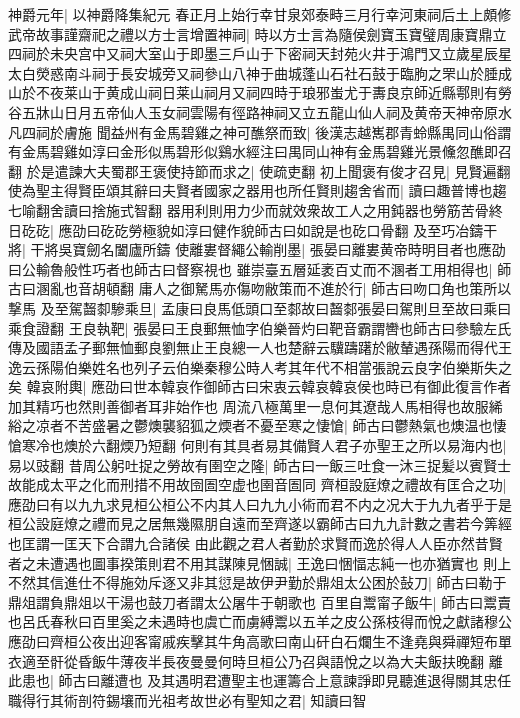神爵元年|{
	以神爵降集紀元}
春正月上始行幸甘泉郊泰畤三月行幸河東祠后土上頗修武帝故事謹齋祀之禮以方士言增置神祠|{
	時以方士言為隨侯劍寶玉寶璧周康寶鼎立四祠於未央宫中又祠大室山于即墨三戶山于下密祠天封苑火井于鴻門又立歲星辰星太白熒惑南斗祠于長安城旁又祠參山八神于曲城蓬山石社石鼓于臨朐之罘山於腄成山於不夜莱山于黄成山祠日莱山祠月又祠四時于琅邪蚩尤于夀良京師近縣鄠則有勞谷五牀山日月五帝仙人玉女祠雲陽有徑路神祠又立五龍山仙人祠及黄帝天神帝原水凡四祠於膚施}
聞益州有金馬碧雞之神可醮祭而致|{
	後漢志越嶲郡青蛉縣禺同山俗謂有金馬碧雞如淳曰金形似馬碧形似鷄水經注曰禺同山神有金馬碧雞光景儵忽醮即召翻}
於是遣諫大夫蜀郡王褒使持節而求之|{
	使疏吏翻}
初上聞褒有俊才召見|{
	見賢遍翻}
使為聖主得賢臣頌其辭曰夫賢者國家之器用也所任賢則趨舍省而|{
	讀曰趣普博也趨七喻翻舍讀曰捨施式智翻}
器用利則用力少而就效衆故工人之用鈍器也勞筋苦骨終日矻矻|{
	應劭曰矻矻勞極貌如淳曰健作貌師古曰如說是也矻口骨翻}
及至巧冶鑄干將|{
	干將吳寶劒名闔廬所鑄}
使離婁督繩公輸削墨|{
	張晏曰離婁黄帝時明目者也應劭曰公輸魯般性巧者也師古曰督察視也}
雖崇臺五層延袤百丈而不溷者工用相得也|{
	師古曰溷亂也音胡頓翻}
庸人之御駑馬亦傷吻敝策而不進於行|{
	師古曰吻口角也策所以撃馬}
及至駕齧厀驂乘旦|{
	孟康曰良馬低頭口至䣛故曰齧䣛張晏曰駕則旦至故曰乘曰乘食證翻}
王良執靶|{
	張晏曰王良郵無恤字伯樂晉灼曰靶音霸謂轡也師古曰參驗左氏傳及國語孟子郵無恤郵良劉無止王良總一人也楚辭云驥躊躇於敝輦遇孫陽而得代王逸云孫陽伯樂姓名也列子云伯樂秦穆公時人考其年代不相當張說云良字伯樂斯失之矣}
韓哀附輿|{
	應劭曰世本韓哀作御師古曰宋衷云韓哀韓哀侯也時已有御此復言作者加其精巧也然則善御者耳非始作也}
周流八極萬里一息何其遼哉人馬相得也故服絺綌之凉者不苦盛暑之鬱燠襲貂狐之煗者不憂至寒之悽愴|{
	師古曰鬱熱氣也燠温也悽愴寒冷也燠於六翻煗乃短翻}
何則有其具者易其備賢人君子亦聖王之所以易海内也|{
	易以豉翻}
昔周公躬吐捉之勞故有圉空之隆|{
	師古曰一飯三吐食一沐三捉髪以賓賢士故能成太平之化而刑措不用故囹圄空虚也圉音圄同}
齊桓設庭燎之禮故有匡合之功|{
	應劭曰有以九九求見桓公桓公不内其人曰九九小術而君不内之况大于九九者乎于是桓公設庭燎之禮而見之居無幾隰朋自遠而至齊遂以霸師古曰九九計數之書若今筭經也匡謂一匡天下合謂九合諸侯}
由此觀之君人者勤於求賢而逸於得人人臣亦然昔賢者之未遭遇也圖事揆策則君不用其謀陳見悃誠|{
	王逸曰悃愊志純一也亦猶實也}
則上不然其信進仕不得施効斥逐又非其愆是故伊尹勤於鼎俎太公困於鼔刀|{
	師古曰勒于鼎俎謂負鼎俎以干湯也鼓刀者謂太公屠牛于朝歌也}
百里自鬻甯子飯牛|{
	師古曰鬻賣也呂氏春秋曰百里奚之未遇時也虞亡而虜縛鬻以五羊之皮公孫枝得而悅之獻諸穆公應劭曰齊桓公夜出迎客甯戚疾擊其牛角高歌曰南山矸白石爛生不逢堯與舜禪短布單衣適至骭從昏飯牛薄夜半長夜曼曼何時旦桓公乃召與語悅之以為大夫飯扶晚翻}
離此患也|{
	師古曰離遭也}
及其遇明君遭聖主也運籌合上意諫諍即見聽進退得關其忠任職得行其術剖符錫壤而光祖考故世必有聖知之君|{
	知讀曰智}
